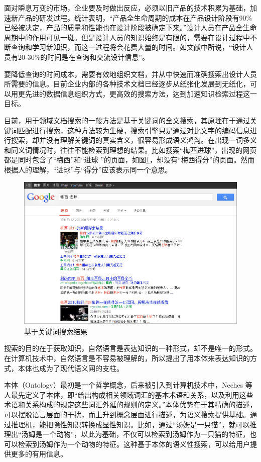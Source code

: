 \documentclass[12pt,a4paper]{article}
\newcommand{\wuhao}{\fontsize{10.5pt}{\baselineskip}\selectfont}
\begin{document}
	面对瞬息万变的市场，企业要及时做出反应，必须以旧产品的技术积累为基础，加速新产品的研发过程。统计表明，“产品全生命周期的成本在产品设计阶段有90\%已经被决定，产品的质量和性能也在设计阶段被确定下来。”\cite{2}设计人员在产品全生命周期中的作用可见一斑。但是设计人员的知识始终是有限的，需要在设计过程中不断查询和学习新知识，而这一过程将会花费大量的时间。如文献\cite{1}中所说，“设计人员有20-30\%的时间是在查询和交流设计信息”。
   
	要降低查询的时间成本，需要有效地组织文档，并从中快速而准确搜索出设计人员所需要的信息。目前企业内部的各种技术文档已经逐步从纸张化发展到无纸化，可以用更先进的数据信息组织方式，更高效的搜索方法，达到加速知识检索过程这一目标。
   
	目前，用于领域文档搜索的一般方法是基于关键词的全文搜索，其原理在于通过关键词匹配进行搜索，这种方法较为生硬，搜索引擎只是通过对比文字的编码信息进行搜索，却并没有理解关键词的真实含义，很容易形成语义鸿沟。在出现一词多义和同义词情况时，往往不能检索到理想的结果。比如搜索“梅西进球”，出现的网页都是同时包含了“梅西”和“进球 ”的页面，如图{\ref{fig:queryExample}}，却没有“梅西得分”的页面。然而根据人的理解，“进球”与“得分”应该表示同一个意思。
   
	\begin{figure}[htbp] 
	\centering\includegraphics[width=5in]{queryExample.png} 
	\caption{\wuhao 基于关键词搜索结果}\label{fig:queryExample} 
	\end{figure} 
   
	搜索的目的在于获取知识，自然语言是表达知识的一种形式，却不是唯一的形式。在计算机技术中，自然语言是不容易被理解的，所以提出了用本体来表达知识的方式，本体也成为了现代语义网的支柱。
   
	本体（{\Times Ontology}）最初是一个哲学概念，后来被引入到计算机技术中，{\Times Neches} 等人最先定义了本体，即“给出构成相关领域词汇的基本术语和关系，以及利用这些术语和关系构成的规定这些词汇外延的规则的定义。”\cite{3}本体优势在于其精确的描述，可以摆脱语言层面的干扰，而上升到概念层面进行描述，为语义搜索提供基础。通过推理机，能把隐性知识转换成显性知识。比如，通过“汤姆是一只猫”，就可以推理出“汤姆是一个动物”，以此为基础，不仅可以检索到汤姆作为一只猫的特征，也可以检索到汤姆作为一个动物的特征。这种基于本体的语义性搜索，可以给用户提供更多的有用信息。
   
\end{document}
